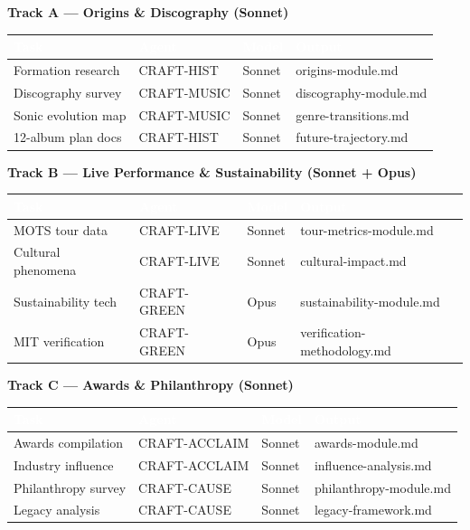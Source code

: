 \documentclass[11pt,letterpaper]{article}
\newcommand{\tableheader}[1]{\textbf{\sffamily\textcolor{white}{#1}}}
\begin{document}
\textbf{Track A --- Origins \& Discography (Sonnet)}

\begin{center}
\begin{tabularx}{\textwidth}{L{2.5cm}L{2.5cm}C{1.2cm}X}
\toprule
{}
\tableheader{Task} & \tableheader{Agent} & \tableheader{Model} & \tableheader{Output} \\
\midrule
Formation research & CRAFT-HIST & Sonnet & origins-module.md \\
Discography survey & CRAFT-MUSIC & Sonnet & discography-module.md \\
Sonic evolution map & CRAFT-MUSIC & Sonnet & genre-transitions.md \\
12-album plan docs & CRAFT-HIST & Sonnet & future-trajectory.md \\
\bottomrule
\end{tabularx}
\end{center}

\textbf{Track B --- Live Performance \& Sustainability (Sonnet + Opus)}

\begin{center}
\begin{tabularx}{\textwidth}{L{2.5cm}L{2.5cm}C{1.2cm}X}
\toprule
{}
\tableheader{Task} & \tableheader{Agent} & \tableheader{Model} & \tableheader{Output} \\
\midrule
MOTS tour data & CRAFT-LIVE & Sonnet & tour-metrics-module.md \\
Cultural phenomena & CRAFT-LIVE & Sonnet & cultural-impact.md \\
Sustainability tech & CRAFT-GREEN & Opus & sustainability-module.md \\
MIT verification & CRAFT-GREEN & Opus & verification-methodology.md \\
\bottomrule
\end{tabularx}
\end{center}

\textbf{Track C --- Awards \& Philanthropy (Sonnet)}

\begin{center}
\begin{tabularx}{\textwidth}{L{2.5cm}L{2.5cm}C{1.2cm}X}
\toprule
{}
\tableheader{Task} & \tableheader{Agent} & \tableheader{Model} & \tableheader{Output} \\
\midrule
Awards compilation & CRAFT-ACCLAIM & Sonnet & awards-module.md \\
Industry influence & CRAFT-ACCLAIM & Sonnet & influence-analysis.md \\
Philanthropy survey & CRAFT-CAUSE & Sonnet & philanthropy-module.md \\
Legacy analysis & CRAFT-CAUSE & Sonnet & legacy-framework.md \\
\bottomrule
\end{tabularx}
\end{center}
\end{document}
